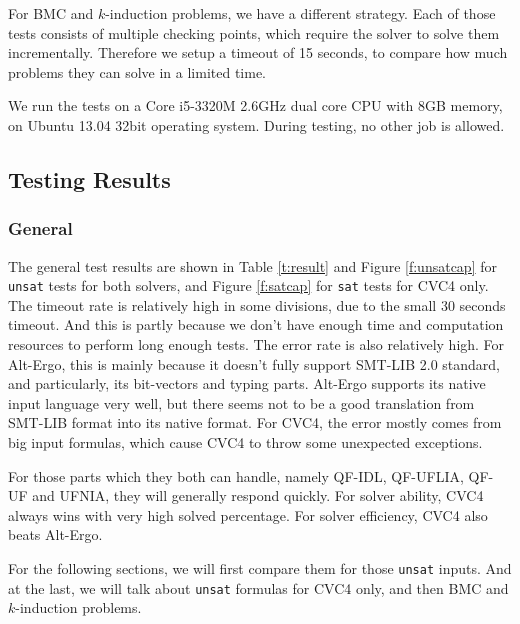 \documentclass[10pt,letter]{article}
\theoremstyle{definition}
\begin{document}
For BMC and $k$-induction problems, we have a different strategy. Each of those tests consists of multiple checking points, which require the solver to solve them incrementally. Therefore we setup a timeout of 15 seconds, to compare how much problems they can solve in a limited time.

We run the tests on a Core i5-3320M 2.6GHz dual core CPU with 8GB memory, on Ubuntu 13.04 32bit operating system. During testing, no other job is allowed.



\subsection{Testing Results}

\subsubsection{General}

The general test results are shown in Table \ref{t:result} and Figure \ref{f:unsatcap} for {\tt unsat} tests for both solvers, and Figure \ref{f:satcap} for {\tt sat} tests for CVC4 only. The timeout rate is relatively high in some divisions, due to the small 30 seconds timeout. And this is partly because we don't have enough time and computation resources to perform long enough tests. The error rate is also relatively high. For Alt-Ergo, this is mainly because it doesn't fully support SMT-LIB 2.0 standard, and particularly, its bit-vectors and typing parts. Alt-Ergo supports its native input language very well, but there seems not to be a good translation from SMT-LIB format into its native format. For CVC4, the error mostly comes from big input formulas, which cause CVC4 to throw some unexpected exceptions.

For those parts which they both can handle, namely QF-IDL, QF-UFLIA, QF-UF and UFNIA, they will generally respond quickly. For solver ability, CVC4 always wins with very high solved percentage. For solver efficiency, CVC4 also beats Alt-Ergo.

For the following sections, we will first compare them for those {\tt unsat} inputs. And at the last, we will talk about {\tt unsat} formulas for CVC4 only, and then BMC and $k$-induction problems.
\end{document}
